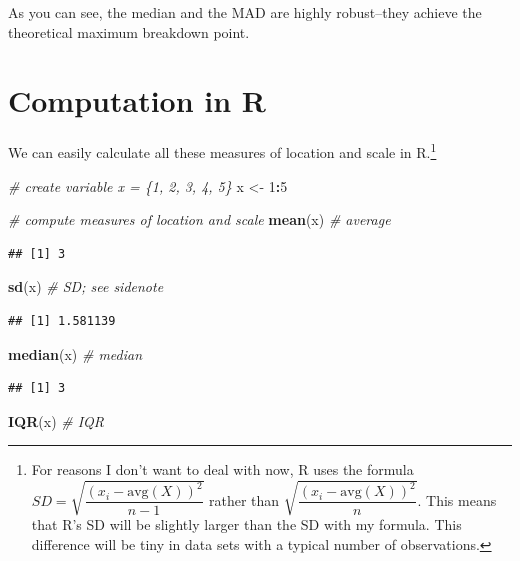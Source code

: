 \documentclass[]{book}
\newenvironment{Shaded}{\begin{snugshade}}{\end{snugshade}}
\newcommand{\CommentTok}[1]{\textcolor[rgb]{0.56,0.35,0.01}{\textit{#1}}}
\newcommand{\DecValTok}[1]{\textcolor[rgb]{0.00,0.00,0.81}{#1}}
\newcommand{\KeywordTok}[1]{\textcolor[rgb]{0.13,0.29,0.53}{\textbf{#1}}}
\newcommand{\NormalTok}[1]{#1}
\newcommand{\OperatorTok}[1]{\textcolor[rgb]{0.81,0.36,0.00}{\textbf{#1}}}
\newcommand{\StringTok}[1]{\textcolor[rgb]{0.31,0.60,0.02}{#1}}
\let\rmarkdownfootnote\footnote%
\def\footnote{\protect\rmarkdownfootnote}
\begin{document}
As you can see, the median and the MAD are highly robust--they achieve the theoretical maximum breakdown point.

\hypertarget{computation-in-r}{%
\section{Computation in R}\label{computation-in-r}}

We can easily calculate all these measures of location and scale in R.\footnote{For reasons I don't want to deal with now, R uses the formula \(SD = \sqrt{\dfrac{(x_i - \text{avg}(X))^2}{n - 1}}\) rather than \(\sqrt{\dfrac{(x_i - \text{avg}(X))^2}{n}}\). This means that R's SD will be slightly larger than the SD with my formula. This difference will be tiny in data sets with a typical number of observations.}

\begin{Shaded}
\begin{Highlighting}[]
\CommentTok{# create variable x = \{1, 2, 3, 4, 5\}}
\NormalTok{x <-}\StringTok{ }\DecValTok{1}\OperatorTok{:}\DecValTok{5}

\CommentTok{# compute measures of location and scale}
\KeywordTok{mean}\NormalTok{(x)  }\CommentTok{# average}
\end{Highlighting}
\end{Shaded}

\begin{verbatim}
## [1] 3
\end{verbatim}

\begin{Shaded}
\begin{Highlighting}[]
\KeywordTok{sd}\NormalTok{(x) }\CommentTok{# SD; see sidenote}
\end{Highlighting}
\end{Shaded}

\begin{verbatim}
## [1] 1.581139
\end{verbatim}

\begin{Shaded}
\begin{Highlighting}[]
\KeywordTok{median}\NormalTok{(x)  }\CommentTok{# median}
\end{Highlighting}
\end{Shaded}

\begin{verbatim}
## [1] 3
\end{verbatim}

\begin{Shaded}
\begin{Highlighting}[]
\KeywordTok{IQR}\NormalTok{(x)  }\CommentTok{# IQR}
\end{Highlighting}
\end{Shaded}
\end{document}
